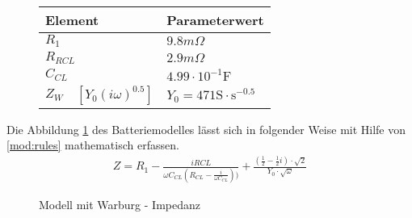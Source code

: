 \begin{figure}[ht]
\begin{tabular}{|l l l|}
\hline 
\multicolumn{2}{|l}{Element} & Parameterwert \\ 
\hline 
\multicolumn{2}{|l}{$R_1$} & $9.8 m\Omega$ \\ 
\multicolumn{2}{|l}{$R_{RCL}$} & $2.9 m\Omega$ \\ 
\multicolumn{2}{|l}{$C_{CL}$} & $4.99 \cdot 10^{-1} \mathrm{F}$ \\ 
$Z_W$ & $[Y_0(i \omega)^{0.5}] $ & $Y_0=471 \mathrm{S} \cdot \mathrm{s}^{-0.5}$ \\ 
\hline 
\end{tabular}
\end{figure}
Die Abbildung \ref{fig:WModell} des Batteriemodelles lässt sich in folgender Weise mit Hilfe von \ref{mod:rules} mathematisch erfassen. 
\begin{align}
	Z = R_1 - \frac{i RCL}{\omega C_{CL} \left(R_{CL}-\frac{i}{\omega C_{CL}} \right))}+\frac{\left(\frac{1}{2}-\frac{1}{2} i\right) \cdot \sqrt{2}}{Y_0 \cdot \sqrt{\omega}}              
\end{align}
\begin{figure}
	\centering
	\def\svgwidth{1\columnwidth}
	
	\caption{Modell mit Warburg - Impedanz}
	\label{fig:WModell}
\end{figure}



